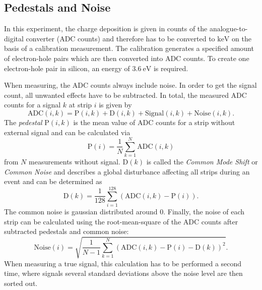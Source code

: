 \subsection{Pedestals and Noise}
\label{ch:ped}
In this experiment, the charge deposition is given in counts of the analogue-to-digital converter (ADC counts) and therefore has to be converted to $\unit{\kilo\eV}$ 
on the basis of a calibration measurement. The calibration generates a specified amount of electron-hole pairs which are then converted into ADC counts.
To create one electron-hole pair in silicon, an energy of $\qty{3.6}{\eV}$ \cite{SiliconStrip} is required.

When measuring, the ADC counts always include noise. In order to get the signal count, all unwanted effects have to be subtracted.
In total, the measured ADC counts for a signal $k$ at strip $i$ is given by 
\begin{equation}
    \text{ADC}(i, k) = \text{P}(i, k) + \text{D}(i,k) + \text{Signal}(i, k) + \text{Noise}(i, k).
    \label{eq:ADC}
\end{equation}    
The \textit{pedestal} $\text{P}(i, k)$ is the mean value of ADC counts for a strip without external signal and can be calculated via 
\begin{equation}
    \text{P}(i) = \frac{1}{N} \sum^N_{k = 1} \text{ADC}(i,k)
    \label{eq:pedestals}
\end{equation}
from $N$ measurements without signal. $\text{D}(k)$ is called the \textit{Common Mode Shift} or \textit{Common Noise} and describes a global disturbance affecting all 
strips during an event and can be determined as 
\begin{equation}
    \text{D}(k) = \frac{1}{128} \sum^{128}_{i = 1} (\text{ADC}(i,k) -\text{P}(i)).
    \label{eq:common_noise}
\end{equation}
The common noise is gaussian distributed around 0.
Finally, the noise of each strip can be calculated using the root-mean-square of the ADC counts after subtracted pedestals and common noise:
\begin{equation}
    \text{Noise}(i) = \sqrt{\frac{1}{N-1} \sum^{N}_{k = 1} (\text{ADC}(i,k) -\text{P}(i) - \text{D}(k))^2}.
    \label{eq:noise}
\end{equation}
When measuring a true signal, this calculation has to be performed a second time, where signals several standard deviations above the noise level are then sorted out.

